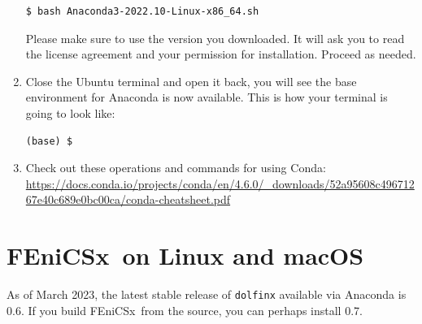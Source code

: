 \documentclass[12pt]{article}
\newcommand{\fenicsx}{\textsf{FEniCSx}}
\begin{document}
\begin{enumerate}[label={\arabic*.}, leftmargin= 0.6 cm,itemsep = 0.25cm,topsep= .25cm]
\begin{lstlisting}[style=terminal]
$ bash Anaconda3-2022.10-Linux-x86_64.sh
\end{lstlisting}

Please make sure to use the version you downloaded. It will ask you to read the license agreement and your permission for installation. Proceed as needed.

\item Close the Ubuntu terminal and open it back, you will see the base environment for Anaconda is now available. This is how your terminal is going to look like:
\begin{lstlisting}[style=terminal]
(base) $ 
\end{lstlisting}

\item Check out these operations and commands for using Conda: \url{https://docs.conda.io/projects/conda/en/4.6.0/_downloads/52a95608c49671267e40c689e0bc00ca/conda-cheatsheet.pdf}

\end{enumerate}

\section*{\fenicsx \ on Linux and macOS}

As of March 2023, the latest stable release of \texttt{dolfinx} available via Anaconda is 0.6. If you build \fenicsx \ from the source, you can perhaps install 0.7.
\end{document}
